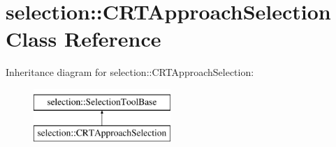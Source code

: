 \hypertarget{classselection_1_1CRTApproachSelection}{}\section{selection\+:\+:C\+R\+T\+Approach\+Selection Class Reference}
\label{classselection_1_1CRTApproachSelection}
Inheritance diagram for selection\+:\+:C\+R\+T\+Approach\+Selection\+:\begin{figure}[H]
\begin{center}
\leavevmode
\includegraphics[height=2.000000cm]{classselection_1_1CRTApproachSelection}
\end{center}
\end{figure}

